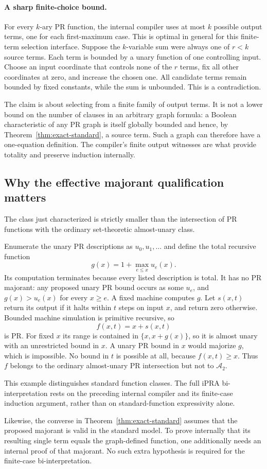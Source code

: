 \paragraph{A sharp finite-choice bound.}
For every $k$-ary PR function, the internal compiler uses at most $k$ possible output terms, one for each first-maximum case. This is optimal in general for this finite-term selection interface. Suppose the $k$-variable sum were always one of $r<k$ source terms. Each term is bounded by a unary function of one controlling input. Choose an input coordinate that controls none of the $r$ terms, fix all other coordinates at zero, and increase the chosen one. All candidate terms remain bounded by fixed constants, while the sum is unbounded. This is a contradiction.

The claim is about selecting from a finite family of output terms. It is not a lower bound on the number of clauses in an arbitrary graph formula: a Boolean characteristic of any PR graph is itself globally bounded and hence, by Theorem~\ref{thm:exact-standard}, a source term. Such a graph can therefore have a one-equation definition. The compiler's finite output witnesses are what provide totality and preserve induction internally.

\subsection{Why the effective majorant qualification matters}
The class just characterized is strictly smaller than the intersection of PR functions with the ordinary set-theoretic almost-unary class.

Enumerate the unary PR descriptions as $u_0,u_1,\ldots$ and define the total recursive function
\[
                         g(x)=1+\max_{e\leq x}u_e(x).
\]
Its computation terminates because every listed description is total. It has no PR majorant: any proposed unary PR bound occurs as some $u_e$, and $g(x)>u_e(x)$ for every $x\geq e$. A fixed machine computes $g$. Let $s(x,t)$ return its output if it halts within $t$ steps on input $x$, and return zero otherwise. Bounded machine simulation is primitive recursive, so
\[
                              f(x,t)=x+s(x,t)
\]
is PR. For fixed $x$ its range is contained in $\{x,x+g(x)\}$, so it is almost unary with an unrestricted bound in $x$. A unary PR bound in $x$ would majorize $g$, which is impossible. No bound in $t$ is possible at all, because $f(x,t)\geq x$. Thus $f$ belongs to the ordinary almost-unary PR intersection but not to $\mathcal A_2$.

This example distinguishes standard function classes. The full iPRA bi-interpretation rests on the preceding internal compiler and its finite-case induction argument, rather than on standard-function expressivity alone.

Likewise, the converse in Theorem~\ref{thm:exact-standard} assumes that the proposed majorant is valid in the standard model. To prove internally that its resulting single term equals the graph-defined function, one additionally needs an internal proof of that majorant. No such extra hypothesis is required for the finite-case bi-interpretation.
